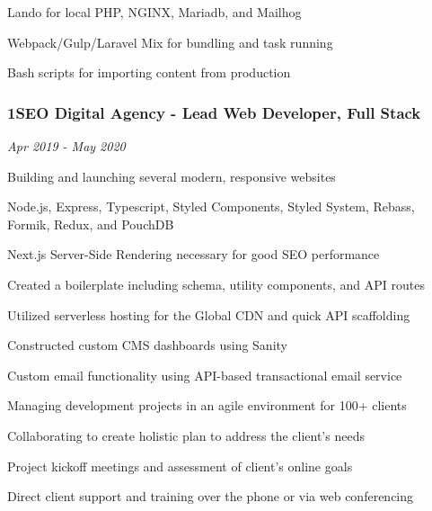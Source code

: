 \documentclass{article}
\newenvironment{narrow_list}{
	\begin{itemize}
		\setlength{\itemsep}{0pt}
		\setlength{\parskip}{-1pt}
		\setlength{\parsep}{0pt}
	}{\end{itemize}
}
\begin{document}
	\begin{narrow_list}
		\item Lando for local PHP, NGINX, Mariadb, and Mailhog
		\item Webpack/Gulp/Laravel Mix for bundling and task running
		\item Bash scripts for importing content from production
	\end{narrow_list}


	\vspace{2mm}

	\subsubsection*{1SEO Digital Agency - Lead Web Developer, Full Stack}

	\vspace{-1.5mm}

	\textit{Apr 2019 - May 2020}

	Building and launching several modern, responsive websites

	\begin{narrow_list}
		\item Node.js, Express, Typescript, Styled Components, Styled System, Rebass, Formik, Redux, and PouchDB
		\item Next.js Server-Side Rendering necessary for good SEO performance
		\item Created a boilerplate including schema, utility components, and API routes
		\item Utilized serverless hosting for the Global CDN and quick API scaffolding
		\item Constructed custom CMS dashboards using Sanity
		\item Custom email functionality using API-based transactional email service
	\end{narrow_list}

	Managing development projects in an agile environment for 100+ clients

	\begin{narrow_list}
		\item Collaborating to create holistic plan to address the client’s needs
		\item Project kickoff meetings and assessment of client's online goals
		\item Direct client support and training over the phone or via web conferencing
	\end{narrow_list}
\end{document}
